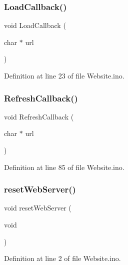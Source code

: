 \mbox{\label{_website_8ino_a9eb581207649c885c5e64a733761f67e}} 
\subsubsection{\texorpdfstring{LoadCallback()}{LoadCallback()}}
{\footnotesize\ttfamily void Load\+Callback (\begin{DoxyParamCaption}\item[{char $\ast$}]{url }\end{DoxyParamCaption})}



Definition at line 23 of file Website.\+ino.

\mbox{\label{_website_8ino_a0dc4b51f027287a3afc1aa783332505d}} 
\subsubsection{\texorpdfstring{RefreshCallback()}{RefreshCallback()}}
{\footnotesize\ttfamily void Refresh\+Callback (\begin{DoxyParamCaption}\item[{char $\ast$}]{url }\end{DoxyParamCaption})}



Definition at line 85 of file Website.\+ino.

\mbox{\label{_website_8ino_af141387cf1674081eca9db00c3c869ab}} 
\subsubsection{\texorpdfstring{resetWebServer()}{resetWebServer()}}
{\footnotesize\ttfamily void reset\+Web\+Server (\begin{DoxyParamCaption}\item[{void}]{ }\end{DoxyParamCaption})}



Definition at line 2 of file Website.\+ino.

